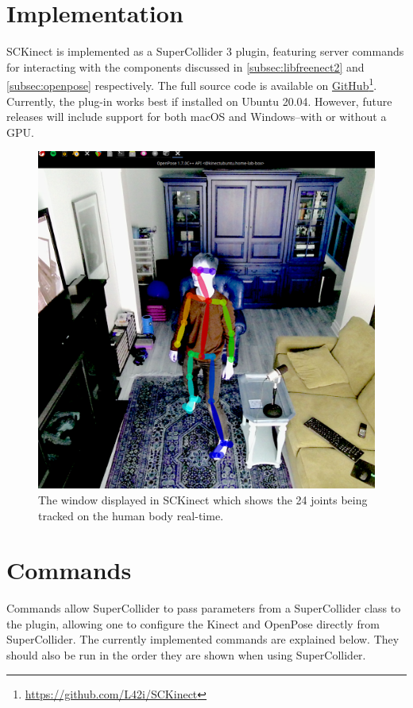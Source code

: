 \documentclass{article}
\begin{document}
\section{Implementation}\label{sec:implementation}
SCKinect is implemented as a SuperCollider 3 plugin, featuring server commands for interacting with the components discussed in \ref{subsec:libfreenect2} and \ref{subsec:openpose} respectively. The full source code is available on \href{https://github.com/L42i/SCKinect}{GitHub}\footnote{\href{https://github.com/L42i/SCKinect}{https://github.com/L42i/SCKinect}\label{footnote:sckinect_github}}. Currently, the plug-in works best if installed on Ubuntu 20.04. However, future releases will include support for both macOS and Windows--with or without a GPU.

\begin{figure}[htbp]
\centering
\includegraphics[width=0.9\columnwidth]{Pose.png}
\caption{The window displayed in SCKinect which shows the 24 joints being tracked on the human body real-time. \label{fig:pose}}
\end{figure}

\section{Commands}\label{sec:commands}
Commands allow SuperCollider to pass parameters from a SuperCollider class to the plugin, allowing one to configure the Kinect and OpenPose directly from SuperCollider. The currently implemented commands are explained below. They should also be run in the order they are shown when using SuperCollider.
\end{document}
